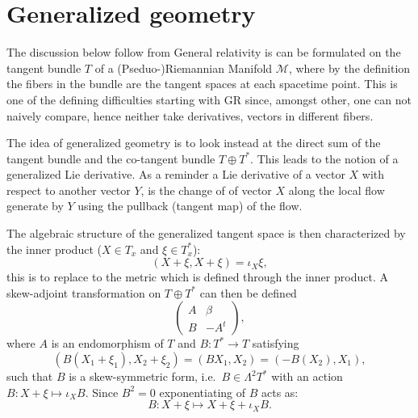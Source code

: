 \documentclass{article}
\begin{document}
\tableofcontents

\section{Generalized geometry}
The discussion below follow from \cite{Hitchin2010}
General relativity is can be formulated on the tangent bundle $T$ of a (Pseduo-)Riemannian Manifold $\mathcal{M}$, where by the definition the fibers in the bundle are the tangent spaces at each spacetime point. This is one of the defining difficulties starting with GR since, amongst other, one can not naively compare, hence neither take derivatives, vectors in different fibers. 

The idea of generalized geometry is to look instead at the direct sum of the tangent bundle and the co-tangent bundle $T\oplus T^*$. This leads to the notion of a generalized Lie derivative. As a reminder a Lie derivative of a vector $X$ with respect to another vector $Y$, is the change of of vector $X$ along the local flow generate by $Y$ using the pullback (tangent map) of the flow. 

The algebraic structure of the generalized tangent space is then characterized by the inner product ($X\in T_x$ and $\xi\in T^*_x$):
\begin{equation}
    (X+\xi,X+\xi) = \iota_X \xi,
\end{equation}
this is to replace to the metric which is defined through the inner product. A skew-adjoint transformation on $T\oplus T^*$ can then be defined 
\begin{equation}
    \begin{pmatrix}
        A & \beta \\
        B & -A^t
    \end{pmatrix},
\end{equation}
where $A$ is an endomorphism of $T$ and $B: T^*\to T$ satisfying 
\begin{equation}
    (B(X_1+\xi_1),X_2+\xi_2) = (BX_1,X_2) = (-B(X_2),X_1),
\end{equation}
such that $B$ is a skew-symmetric form, i.e.\ $B\in \Lambda^2T^*$ with an action $B: X+\xi\mapsto \iota_X B$. Since $B^2=0$ exponentiating of $B$ acts as:
\begin{equation}
    B: X+\xi \mapsto X+\xi+\iota_X B.
\end{equation}
\end{document}
